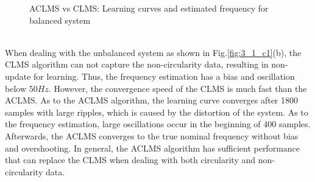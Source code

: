 \begin{figure}[htb]
\begin{subfigure}[b]{0.32\textwidth}
    \end{subfigure}  
    \caption{ACLMS vs CLMS: Learning curves and estimated frequency for balanced system}
    \label{fig:3_1_e1}
\end{figure}\\
When dealing with the unbalanced system as shown in Fig.\ref{fig:3_1_c1}(b), the CLMS algorithm can not capture the non-circularity data, resulting in non-update for learning. Thus, the frequency estimation has a bias and oscillation below $50Hz$. However, the convergence speed of the CLMS is much fast than the ACLMS. As to the ACLMS algorithm, the learning curve converges after 1800 samples with large ripples, which is caused by the distortion of the system. As to the frequency estimation, large oscillations occur in the beginning of 400 samples. Afterwards, the ACLMS converges to the true nominal frequency without bias and overshooting. In general, the ACLMS algorithm has sufficient performance that can replace the CLMS when dealing with both circularity and non-circularity data.
